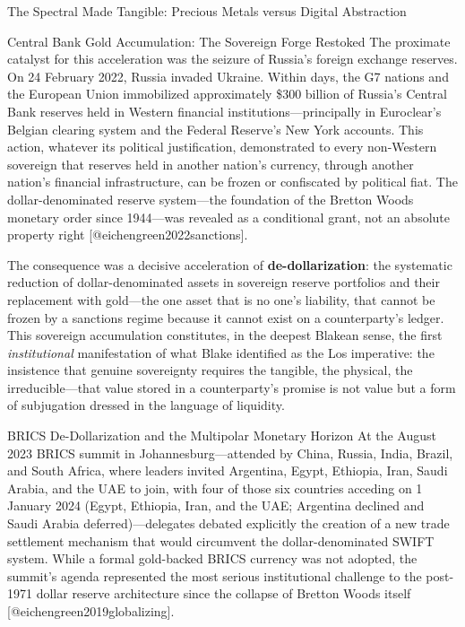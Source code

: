 \documentclass[
  ignorenonframetext,
]{beamer}
\begin{document}
\begin{frame}{The Spectral Made Tangible: Precious Metals versus Digital
Abstraction}
\begin{block}{Central Bank Gold Accumulation: The Sovereign Forge
Restoked}
The proximate catalyst for this acceleration was the seizure of Russia's
foreign exchange reserves. On 24 February 2022, Russia invaded Ukraine.
Within days, the G7 nations and the European Union immobilized
approximately \$300 billion of Russia's Central Bank reserves held in
Western financial institutions---principally in Euroclear's Belgian
clearing system and the Federal Reserve's New York accounts. This
action, whatever its political justification, demonstrated to every
non-Western sovereign that reserves held in another nation's currency,
through another nation's financial infrastructure, can be frozen or
confiscated by political fiat. The dollar-denominated reserve
system---the foundation of the Bretton Woods monetary order since
1944---was revealed as a conditional grant, not an absolute property
right {[}@eichengreen2022sanctions{]}.

The consequence was a decisive acceleration of
\textbf{de-dollarization}: the systematic reduction of
dollar-denominated assets in sovereign reserve portfolios and their
replacement with gold---the one asset that is no one's liability, that
cannot be frozen by a sanctions regime because it cannot exist on a
counterparty's ledger. This sovereign accumulation constitutes, in the
deepest Blakean sense, the first \emph{institutional} manifestation of
what Blake identified as the Los imperative: the insistence that genuine
sovereignty requires the tangible, the physical, the irreducible---that
value stored in a counterparty's promise is not value but a form of
subjugation dressed in the language of liquidity.
\end{block}

\begin{block}{BRICS De-Dollarization and the Multipolar Monetary
Horizon}
\protect{}\label{brics-de-dollarization-and-the-multipolar-monetary-horizon}
At the August 2023 BRICS summit in Johannesburg---attended by China,
Russia, India, Brazil, and South Africa, where leaders invited
Argentina, Egypt, Ethiopia, Iran, Saudi Arabia, and the UAE to join,
with four of those six countries acceding on 1 January 2024 (Egypt,
Ethiopia, Iran, and the UAE; Argentina declined and Saudi Arabia
deferred)---delegates debated explicitly the creation of a new trade
settlement mechanism that would circumvent the dollar-denominated SWIFT
system. While a formal gold-backed BRICS currency was not adopted, the
summit's agenda represented the most serious institutional challenge to
the post-1971 dollar reserve architecture since the collapse of Bretton
Woods itself {[}@eichengreen2019globalizing{]}.


\end{block}
\end{frame}
\end{document}
